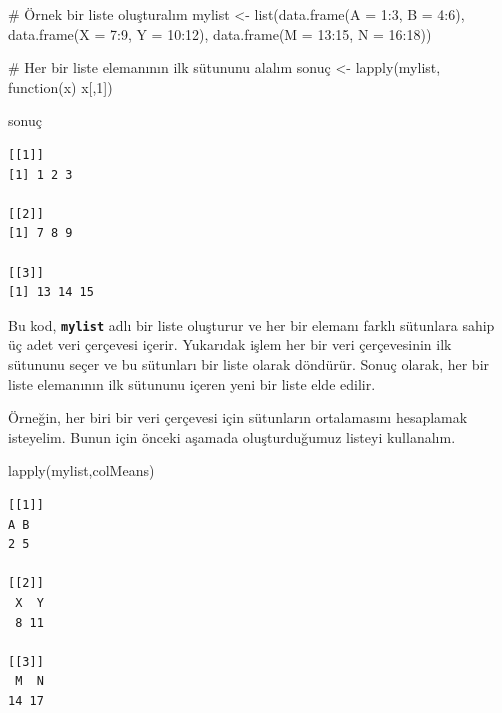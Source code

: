 \documentclass[
  letterpaper,
  DIV=11,
  numbers=noendperiod]{scrreprt}
\newenvironment{Shaded}{\begin{snugshade}}{\end{snugshade}}
\newcommand{\AttributeTok}[1]{\textcolor[rgb]{0.40,0.45,0.13}{#1}}
\newcommand{\CommentTok}[1]{\textcolor[rgb]{0.37,0.37,0.37}{#1}}
\newcommand{\ControlFlowTok}[1]{\textcolor[rgb]{0.00,0.23,0.31}{#1}}
\newcommand{\DecValTok}[1]{\textcolor[rgb]{0.68,0.00,0.00}{#1}}
\newcommand{\FunctionTok}[1]{\textcolor[rgb]{0.28,0.35,0.67}{#1}}
\newcommand{\NormalTok}[1]{\textcolor[rgb]{0.00,0.23,0.31}{#1}}
\newcommand{\OtherTok}[1]{\textcolor[rgb]{0.00,0.23,0.31}{#1}}
\newcommand{\SpecialCharTok}[1]{\textcolor[rgb]{0.37,0.37,0.37}{#1}}
\begin{document}
\begin{Shaded}
\begin{Highlighting}[]
\CommentTok{\# Örnek bir liste oluşturalım}
\NormalTok{mylist }\OtherTok{\textless{}{-}} \FunctionTok{list}\NormalTok{(}\FunctionTok{data.frame}\NormalTok{(}\AttributeTok{A =} \DecValTok{1}\SpecialCharTok{:}\DecValTok{3}\NormalTok{, }\AttributeTok{B =} \DecValTok{4}\SpecialCharTok{:}\DecValTok{6}\NormalTok{),}
               \FunctionTok{data.frame}\NormalTok{(}\AttributeTok{X =} \DecValTok{7}\SpecialCharTok{:}\DecValTok{9}\NormalTok{, }\AttributeTok{Y =} \DecValTok{10}\SpecialCharTok{:}\DecValTok{12}\NormalTok{),}
               \FunctionTok{data.frame}\NormalTok{(}\AttributeTok{M =} \DecValTok{13}\SpecialCharTok{:}\DecValTok{15}\NormalTok{, }\AttributeTok{N =} \DecValTok{16}\SpecialCharTok{:}\DecValTok{18}\NormalTok{))}

\CommentTok{\# Her bir liste elemanının ilk sütununu alalım}
\NormalTok{sonuç }\OtherTok{\textless{}{-}} \FunctionTok{lapply}\NormalTok{(mylist, }\ControlFlowTok{function}\NormalTok{(x) x[,}\DecValTok{1}\NormalTok{])}

\NormalTok{sonuç}
\end{Highlighting}
\end{Shaded}

\begin{verbatim}
[[1]]
[1] 1 2 3

[[2]]
[1] 7 8 9

[[3]]
[1] 13 14 15
\end{verbatim}

Bu kod, \textbf{\texttt{mylist}} adlı bir liste oluşturur ve her bir
elemanı farklı sütunlara sahip üç adet veri çerçevesi içerir. Yukarıdak
işlem her bir veri çerçevesinin ilk sütununu seçer ve bu sütunları bir
liste olarak döndürür. Sonuç olarak, her bir liste elemanının ilk
sütununu içeren yeni bir liste elde edilir.

Örneğin, her biri bir veri çerçevesi için sütunların ortalamasını
hesaplamak isteyelim. Bunun için önceki aşamada oluşturduğumuz listeyi
kullanalım.

\begin{Shaded}
\begin{Highlighting}[]
\FunctionTok{lapply}\NormalTok{(mylist,colMeans)}
\end{Highlighting}
\end{Shaded}

\begin{verbatim}
[[1]]
A B 
2 5 

[[2]]
 X  Y 
 8 11 

[[3]]
 M  N 
14 17 
\end{verbatim}
\end{document}
